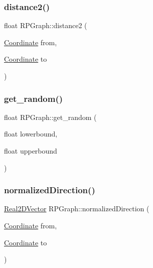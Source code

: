\mbox{\label{namespaceRPGraph_aa54d04cd9574e91651e2566eb868df1f}} 
\subsubsection{\texorpdfstring{distance2()}{distance2()}}
{\footnotesize\ttfamily float R\+P\+Graph\+::distance2 (\begin{DoxyParamCaption}\item[{\mbox{\hyperlink{classRPGraph_1_1Coordinate}{Coordinate}}}]{from,  }\item[{\mbox{\hyperlink{classRPGraph_1_1Coordinate}{Coordinate}}}]{to }\end{DoxyParamCaption})}

\mbox{\label{namespaceRPGraph_af65dfa4ca7a18662d86db71341a4478d}} 
\subsubsection{\texorpdfstring{get\+\_\+random()}{get\_random()}}
{\footnotesize\ttfamily float R\+P\+Graph\+::get\+\_\+random (\begin{DoxyParamCaption}\item[{float}]{lowerbound,  }\item[{float}]{upperbound }\end{DoxyParamCaption})}

\mbox{\label{namespaceRPGraph_ab7f99412b5c91ab02e4a74885a49e9a6}} 
\subsubsection{\texorpdfstring{normalized\+Direction()}{normalizedDirection()}}
{\footnotesize\ttfamily \mbox{\hyperlink{classRPGraph_1_1Real2DVector}{Real2\+D\+Vector}} R\+P\+Graph\+::normalized\+Direction (\begin{DoxyParamCaption}\item[{\mbox{\hyperlink{classRPGraph_1_1Coordinate}{Coordinate}}}]{from,  }\item[{\mbox{\hyperlink{classRPGraph_1_1Coordinate}{Coordinate}}}]{to }\end{DoxyParamCaption})}

